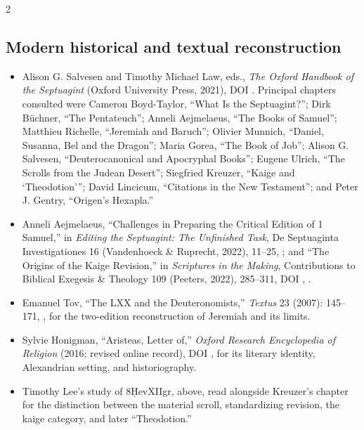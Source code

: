 \begin{multicols}{2}
\subsection*{Modern historical and textual reconstruction}

{\footnotesize
\begin{itemize}[itemsep=0.1em,topsep=0.15em]
\item Alison G. Salvesen and Timothy Michael Law, eds., \emph{The Oxford Handbook of the Septuagint} (Oxford University Press, 2021), DOI . Principal chapters consulted were Cameron Boyd-Taylor, “What Is the Septuagint?”; Dirk B\"uchner, “The Pentateuch”; Anneli Aejmelaeus, “The Books of Samuel”; Matthieu Richelle, “Jeremiah and Baruch”; Olivier Munnich, “Daniel, Susanna, Bel and the Dragon”; Maria Gorea, “The Book of Job”; Alison G. Salvesen, “Deuterocanonical and Apocryphal Books”; Eugene Ulrich, “The Scrolls from the Judean Desert”; Siegfried Kreuzer, “Kaige and ‘Theodotion’”; David Lincicum, “Citations in the New Testament”; and Peter J. Gentry, “Origen's Hexapla.”
\item Anneli Aejmelaeus, “Challenges in Preparing the Critical Edition of 1 Samuel,” in \emph{Editing the Septuagint: The Unfinished Task}, De Septuaginta Investigationes 16 (Vandenhoeck \& Ruprecht, 2022), 11--25, ; and “The Origins of the Kaige Revision,” in \emph{Scriptures in the Making}, Contributions to Biblical Exegesis \& Theology 109 (Peeters, 2022), 285--311, DOI , .
\item Emanuel Tov, “The LXX and the Deuteronomists,” \emph{Textus} 23 (2007): 145--171, , for the two-edition reconstruction of Jeremiah and its limits.
\item Sylvie Honigman, “Aristeas, Letter of,” \emph{Oxford Research Encyclopedia of Religion} (2016; revised online record), DOI , for its literary identity, Alexandrian setting, and historiography.
\item Timothy Lee's study of 8\d{H}evXIIgr, above, read alongside Kreuzer's chapter for the distinction between the material scroll, standardizing revision, the kaige category, and later “Theodotion.”
\end{itemize}}


\end{multicols}
